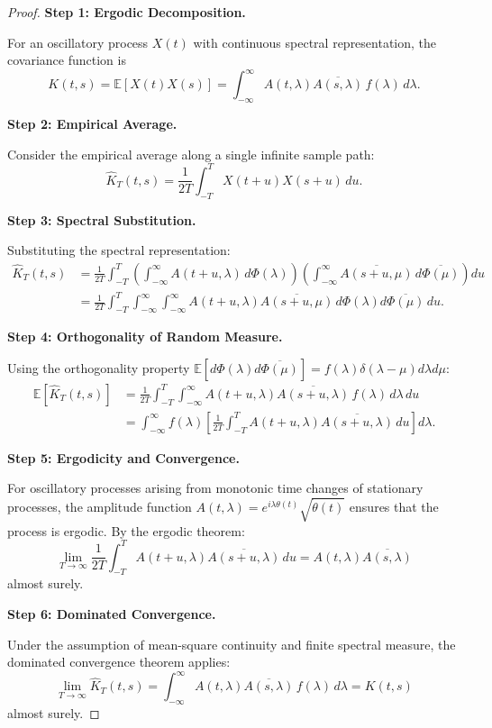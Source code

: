 \documentclass{article}
\begin{document}
\begin{proof}
\textbf{Step 1: Ergodic Decomposition.}

For an oscillatory process $X(t)$ with continuous spectral representation, the covariance function is
\[
K(t,s) = \mathbb{E}[X(t)X(s)] = \int_{-\infty}^\infty A(t,\lambda)\overline{A(s,\lambda)}\, f(\lambda)\, d\lambda.
\]

\textbf{Step 2: Empirical Average.}

Consider the empirical average along a single infinite sample path:
\[
\hat{K}_T(t,s) = \frac{1}{2T} \int_{-T}^T X(t+u) X(s+u)\, du.
\]

\textbf{Step 3: Spectral Substitution.}

Substituting the spectral representation:
\begin{align}
\hat{K}_T(t,s) &= \frac{1}{2T} \int_{-T}^T \left(\int_{-\infty}^\infty A(t+u,\lambda)\, d\Phi(\lambda)\right) \left(\int_{-\infty}^\infty \overline{A(s+u,\mu)}\, d\overline{\Phi(\mu)}\right) du \\
&= \frac{1}{2T} \int_{-T}^T \int_{-\infty}^\infty \int_{-\infty}^\infty A(t+u,\lambda)\overline{A(s+u,\mu)}\, d\Phi(\lambda) d\overline{\Phi(\mu)}\, du.
\end{align}

\textbf{Step 4: Orthogonality of Random Measure.}

Using the orthogonality property $\mathbb{E}[d\Phi(\lambda)d\overline{\Phi(\mu)}] = f(\lambda)\delta(\lambda-\mu)d\lambda d\mu$:
\begin{align}
\mathbb{E}[\hat{K}_T(t,s)] &= \frac{1}{2T} \int_{-T}^T \int_{-\infty}^\infty A(t+u,\lambda)\overline{A(s+u,\lambda)}\, f(\lambda)\, d\lambda\, du \\
&= \int_{-\infty}^\infty f(\lambda) \left[\frac{1}{2T} \int_{-T}^T A(t+u,\lambda)\overline{A(s+u,\lambda)}\, du\right] d\lambda.
\end{align}

\textbf{Step 5: Ergodicity and Convergence.}

For oscillatory processes arising from monotonic time changes of stationary processes, the amplitude function $A(t,\lambda) = e^{i\lambda\theta(t)}\sqrt{\dot\theta(t)}$ ensures that the process is ergodic. By the ergodic theorem:
\[
\lim_{T\to\infty} \frac{1}{2T} \int_{-T}^T A(t+u,\lambda)\overline{A(s+u,\lambda)}\, du = A(t,\lambda)\overline{A(s,\lambda)}
\]
almost surely.

\textbf{Step 6: Dominated Convergence.}

Under the assumption of mean-square continuity and finite spectral measure, the dominated convergence theorem applies:
\[
\lim_{T\to\infty} \hat{K}_T(t,s) = \int_{-\infty}^\infty A(t,\lambda)\overline{A(s,\lambda)}\, f(\lambda)\, d\lambda = K(t,s)
\]
almost surely.

\end{proof}
\end{document}

